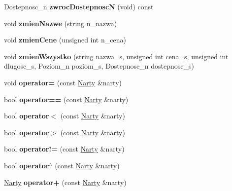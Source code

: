 \begin{DoxyCompactItemize}
Dostepnosc\+\_\+n {\bfseries zwroc\+DostepnoscN} (void) const
\item 
\mbox{\label{class_narty_a35747349d49dc91ff1ac414dcf93a3ad}} 
void {\bfseries zmien\+Nazwe} (string n\+\_\+nazwa)
\item 
\mbox{\label{class_narty_a88225c95156e51dc84d9ddc50a92989f}} 
void {\bfseries zmien\+Cene} (unsigned int n\+\_\+cena)
\item 
\mbox{\label{class_narty_af3f12c0fc248e86f0a9f447edeacbba8}} 
void {\bfseries zmien\+Wszystko} (string nazwa\+\_\+s, unsigned int cena\+\_\+s, unsigned int dlugosc\+\_\+s, Poziom\+\_\+n poziom\+\_\+s, Dostepnosc\+\_\+n dostepnosc\+\_\+s)
\item 
\mbox{\label{class_narty_a18cc9d232e226a63ca1b95d9afd7b1e3}} 
void {\bfseries operator=} (const \hyperlink{class_narty}{Narty} \&narty)
\item 
\mbox{\label{class_narty_a74cd13f61fc4bffea616367961391d54}} 
bool {\bfseries operator==} (const \hyperlink{class_narty}{Narty} \&narty)
\item 
\mbox{\label{class_narty_abd4a3b0f020a2ae9d65668e9dca26d65}} 
bool {\bfseries operator$<$} (const \hyperlink{class_narty}{Narty} \&narty)
\item 
\mbox{\label{class_narty_abd3b42f980291b55ea35e49091aec194}} 
bool {\bfseries operator$>$} (const \hyperlink{class_narty}{Narty} \&narty)
\item 
\mbox{\label{class_narty_a412b7395ba583848b6803d65f747bcb9}} 
bool {\bfseries operator!=} (const \hyperlink{class_narty}{Narty} \&narty)
\item 
\mbox{\label{class_narty_ac18fc5685a7dd1c3fd7e8be18edf869f}} 
bool {\bfseries operator$^\wedge$} (const \hyperlink{class_narty}{Narty} \&narty)
\item 
\mbox{\label{class_narty_a06af67856b6e340325ea906469eec6bd}} 
\hyperlink{class_narty}{Narty} {\bfseries operator+} (const \hyperlink{class_narty}{Narty} \&narty)
\end{DoxyCompactItemize}
